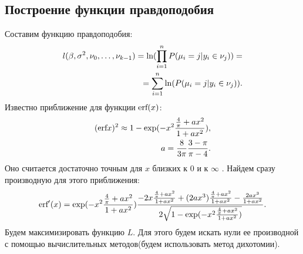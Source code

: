 \documentclass[12pt]{article}
\begin{document}
\subsection{Построение функции правдоподобия}
Составим функцию правдоподобия:
\begin{eqnarray}
    l(\beta,\sigma^2, \nu_0,\dots, \nu_{k-1})=\textup{ln}(\prod_{i=1}^{n}P(\mu_i=j|y_i\in \nu_j))=\\
    =\sum_{i=1}^{n}\ln(P(\mu_i=j|y_i\in \nu_j)).
\end{eqnarray}
Известно приближение для функции $\textup{erf}(x)$:
\begin{eqnarray}
    (\textup{erf} x)^2\approx 1- \exp(-x^2 \frac{\frac{4}{\pi}+ax^2}{1+ax^2}),\\
    a=\frac{8}{3\pi}\frac{3-\pi}{\pi -4}.
\end{eqnarray}
Оно считается достаточно точным для $x$ близких к $0$ и к $\infty$ \cite{Winitzki}. \hfill\break
Найдем сразу производную для этого приближения:
\begin{eqnarray}
    \textup{erf}'(x) = \exp(-x^2 \frac{\frac{4}{\pi}+ax^2}{1+ax^2}) \frac{-2x\frac{\frac{4}{\pi}+ax^2}{1+ax^2}+(2ax^3)\frac{\frac{4}{\pi}+ax^2}{1+ax^2}-\frac{2ax^3}{1+ax^2}}{2\sqrt{1- \exp(-x^2 \frac{\frac{4}{\pi}+ax^2}{1+ax^2})}}.
\end{eqnarray}
Будем максимизировать функцию $L$.
Для этого будем искать нули ее производной с помощью вычислительных методов(будем использовать метод дихотомии).
\end{document}
